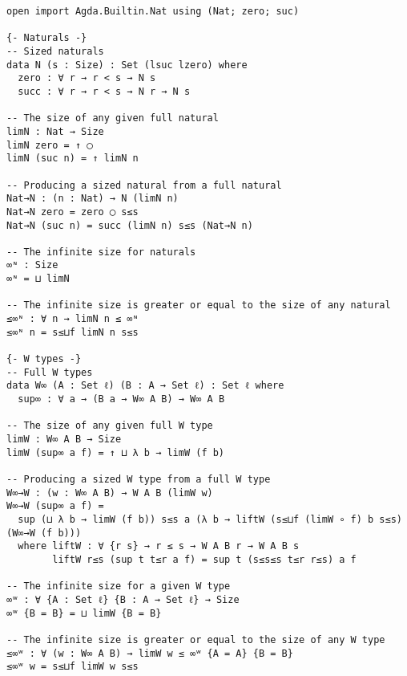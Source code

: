 \begin{singlespace}
\begin{verbatim}
open import Agda.Builtin.Nat using (Nat; zero; suc)

{- Naturals -}
-- Sized naturals
data N (s : Size) : Set (lsuc lzero) where
  zero : ∀ r → r < s → N s
  succ : ∀ r → r < s → N r → N s

-- The size of any given full natural
limN : Nat → Size
limN zero = ↑ ◯
limN (suc n) = ↑ limN n

-- Producing a sized natural from a full natural
Nat→N : (n : Nat) → N (limN n)
Nat→N zero = zero ◯ s≤s
Nat→N (suc n) = succ (limN n) s≤s (Nat→N n)

-- The infinite size for naturals
∞ᶰ : Size
∞ᶰ = ⊔ limN

-- The infinite size is greater or equal to the size of any natural
≤∞ᶰ : ∀ n → limN n ≤ ∞ᶰ
≤∞ᶰ n = s≤⊔f limN n s≤s

{- W types -}
-- Full W types
data W∞ (A : Set ℓ) (B : A → Set ℓ) : Set ℓ where
  sup∞ : ∀ a → (B a → W∞ A B) → W∞ A B

-- The size of any given full W type
limW : W∞ A B → Size
limW (sup∞ a f) = ↑ ⊔ λ b → limW (f b)

-- Producing a sized W type from a full W type
W∞→W : (w : W∞ A B) → W A B (limW w)
W∞→W (sup∞ a f) =
  sup (⊔ λ b → limW (f b)) s≤s a (λ b → liftW (s≤⊔f (limW ∘ f) b s≤s) (W∞→W (f b)))
  where liftW : ∀ {r s} → r ≤ s → W A B r → W A B s
        liftW r≤s (sup t t≤r a f) = sup t (s≤s≤s t≤r r≤s) a f

-- The infinite size for a given W type
∞ʷ : ∀ {A : Set ℓ} {B : A → Set ℓ} → Size
∞ʷ {B = B} = ⊔ limW {B = B}

-- The infinite size is greater or equal to the size of any W type
≤∞ʷ : ∀ (w : W∞ A B) → limW w ≤ ∞ʷ {A = A} {B = B}
≤∞ʷ w = s≤⊔f limW w s≤s
\end{verbatim}
\end{singlespace}